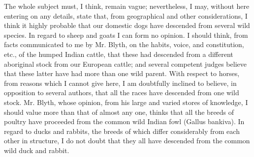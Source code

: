 \documentclass{book}
\begin{document}
The whole subject must, I think, remain vague; nevertheless, I may, without
here entering on any details, state that, from geographical and other
considerations, I think it highly probable that our domestic dogs have
descended from several wild species. In regard to sheep and goats I can form no
opinion. I should think, from facts communicated to me by Mr. Blyth, on the
habits, voice, and constitution, etc., of the humped Indian cattle, that these
had descended from a different aboriginal stock from our European cattle; and
several competent judges believe that these latter have had more than one wild
parent. With respect to horses, from reasons which I cannot give here, I am
doubtfully inclined to believe, in opposition to several authors, that all the
races have descended from one wild stock. Mr. Blyth, whose opinion, from his
large and varied stores of knowledge, I should value more than that of almost
any one, thinks that all the breeds of poultry have proceeded from the common
wild
Indian fowl (Gallus bankiva). In regard to ducks and rabbits, the breeds of
which differ considerably from each other in structure, I do not doubt that
they all have descended from the common wild duck and rabbit.
\end{document}

